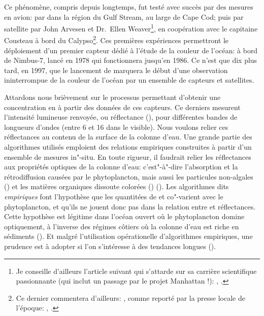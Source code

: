 Ce phénomène, compris depuis longtemps, fut testé avec succès par des mesures en avion:  par \textcite{clarke_1970} dans la région du Gulf Stream, au large de Cape Cod; puis par satellite par John Arvesen et Dr.\ Ellen Weaver\footnote{%
  Je conseille d'ailleurs l'article suivant qui s'attarde sur sa carrière scientifique passionnante (qui inclut un passage par le projet Manhattan !): , \cite{marshall_2010}.},
en coopération avec le capitaine Cousteau à bord du Calypso\footnote{%
  Ce dernier commentera d'ailleurs: , comme reporté par la presse locale de l'époque:
  \href{ https://news.google.com/newspapers?nid=1454&dat=19730320&id=Nmo0AAAAIBAJ&sjid=8QkEAAAAIBAJ&pg=897,4493586&hl=en}{}, \cite{macomber_1973}.
}.
Ces premières expériences permettront le déploiement d'un premier capteur dédié à l'étude de la couleur de l'océan:  à bord de Nimbus-7, lancé en 1978 qui fonctionnera jusqu'en 1986.
Ce n'est que dix plus tard, en 1997, que le lancement de  marquera le début d'une observation ininterrompue de la couleur de l'océan par un ensemble de capteurs et satellites.

Attardons nous brièvement sur le processus permettant d'obtenir une concentration en  à partir des données de ces capteurs.
Ce derniers mesurent l'intensité lumineuse renvoyée, ou réflectance (), pour différentes bandes de longueurs d'ondes (entre 6 et 16 dans le visible).
Nous voulons relier ces réflectances au contenu de la surface de la colonne d'eau.
Une grande partie des algorithmes utilisés emploient des relations empiriques construites à partir d'un ensemble de mesures in"-situ.
En toute rigueur, il faudrait relier les réflectances aux propriétés optiques de la colonne d'eau: c'est"-à"-dire l’absorption et la rétrodiffusion causées par le phytoplancton, mais aussi les particules non-algales () et les matières organiques dissoute colorées () (\cite{werdell_2018}).
Les algorithmes dits \emph{empiriques} font l'hypothèse que les quantitées de  et  co"-varient avec le phytoplancton, et qu'ils ne jouent donc pas dans la relation entre  et réflectances.
Cette hypothèse est légitime dans l'océan ouvert où le phytoplancton domine optiquement, à l'inverse des régimes côtiers où la colonne d'eau est riche en sédiments (\cite{bailey_2006}).
Et malgré l'utilisation opérationelle d'algorithmes empiriques, une prudence est à adopter si l'on s'intéresse à des tendances longues (\cite{dierssen_2010}).

